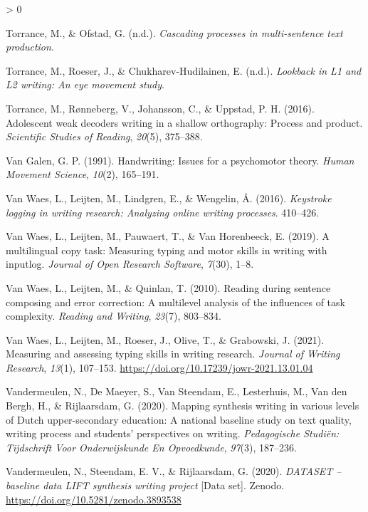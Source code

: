 \documentclass[
  english,
  man,floatsintext]{apa7}
\newlength{\cslhangindent}
\newenvironment{CSLReferences}[2] %
 {%
  \setlength{\parindent}{0pt}
  \ifodd #1 \everypar{\setlength{\hangindent}{\cslhangindent}}\ignorespaces\fi
  \ifnum #2 > 0
  \setlength{\parskip}{#2\baselineskip}
  \fi
 }%
 {}
\begin{document}
\begin{CSLReferences}{1}{0}
\leavevmode\hypertarget{ref-torranceb}{}%
Torrance, M., \& Ofstad, G. (n.d.). \emph{Cascading processes in multi-sentence text production}.

\leavevmode\hypertarget{ref-torrancea}{}%
Torrance, M., Roeser, J., \& Chukharev-Hudilainen, E. (n.d.). \emph{Lookback in {L1 and L2} writing: An eye movement study}.

\leavevmode\hypertarget{ref-torrance2016adolescent}{}%
Torrance, M., Rønneberg, V., Johansson, C., \& Uppstad, P. H. (2016). Adolescent weak decoders writing in a shallow orthography: Process and product. \emph{Scientific Studies of Reading}, \emph{20}(5), 375--388.

\leavevmode\hypertarget{ref-van1991handwriting}{}%
Van Galen, G. P. (1991). Handwriting: Issues for a psychomotor theory. \emph{Human Movement Science}, \emph{10}(2), 165--191.

\leavevmode\hypertarget{ref-van2016keystroke}{}%
Van Waes, L., Leijten, M., Lindgren, E., \& Wengelin, Å. (2016). \emph{Keystroke logging in writing research: Analyzing online writing processes}. 410--426.

\leavevmode\hypertarget{ref-van2019multilingual}{}%
Van Waes, L., Leijten, M., Pauwaert, T., \& Van Horenbeeck, E. (2019). A multilingual copy task: Measuring typing and motor skills in writing with inputlog. \emph{Journal of Open Research Software}, \emph{7}(30), 1--8.

\leavevmode\hypertarget{ref-van2010reading}{}%
Van Waes, L., Leijten, M., \& Quinlan, T. (2010). Reading during sentence composing and error correction: A multilevel analysis of the influences of task complexity. \emph{Reading and Writing}, \emph{23}(7), 803--834.

\leavevmode\hypertarget{ref-waes2019}{}%
Van Waes, L., Leijten, M., Roeser, J., Olive, T., \& Grabowski, J. (2021). Measuring and assessing typing skills in writing research. \emph{Journal of Writing Research}, \emph{13}(1), 107--153. \url{https://doi.org/10.17239/jowr-2021.13.01.04}

\leavevmode\hypertarget{ref-vandermeulen2020mapping}{}%
Vandermeulen, N., De Maeyer, S., Van Steendam, E., Lesterhuis, M., Van den Bergh, H., \& Rijlaarsdam, G. (2020). Mapping synthesis writing in various levels of {Dutch} upper-secondary education: A national baseline study on text quality, writing process and students' perspectives on writing. \emph{Pedagogische Studiën: Tijdschrift Voor Onderwijskunde En Opvoedkunde}, \emph{97}(3), 187--236.

\leavevmode\hypertarget{ref-vandermeulen2020}{}%
Vandermeulen, N., Steendam, E. V., \& Rijlaarsdam, G. (2020). \emph{{DATASET} -- baseline data {LIFT} synthesis writing project} {[}Data set{]}. Zenodo. \url{https://doi.org/10.5281/zenodo.3893538}


\end{CSLReferences}
\end{document}
